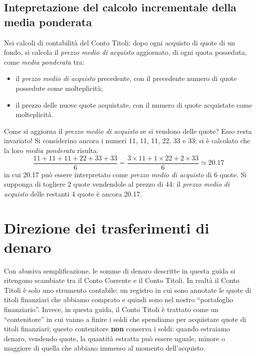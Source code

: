 \documentclass[12pt,a4paper]{article}
\newcommand{\Virgolette}[1]{``#1''}
\newcommand{\Pma}{\emph{prezzo medio di acquisto}}
\begin{document}
\subsection{Intepretazione del calcolo incrementale della media ponderata}

Nei calcoli di contabilità del Conto Titoli: dopo ogni  acquisto di quote di un fondo, si calcola il
\Pma{} aggiornato, di ogni quota posseduta, come \emph{media ponderata} tra:
\begin{itemize}
\item il \Pma{} precedente, con il precedente numero di quote possedute come molteplicità;
\item il prezzo delle nuove quote acquistate, con il numero di quote acquistate come molteplicità.
\end{itemize}

Come si aggiorna il \Pma{} se si vendono  delle quote?  Esso resta invariato!  Si considerino ancora
i numeri  \num{11}, \num{11}, \num{11}, \num{22},  \num{33} e \num{33};  si è calcolato che  la loro
\emph{media ponderata} risulta:
\begin{equation*}
  \frac{\num{11} + \num{11} + \num{11} + \num{22} + \num{33} + \num{33}}{6}
  = \frac{\num{3} \times{} \num{11}
     + \num{1} \times{} \num{22}
     + \num{2} \times{} \num{33}}
  {6} \simeq \num{20,17}
\end{equation*}
in cui \num{20,17}  può essere interpretato come  \Pma{} di \num{6} quote.  Si  supponga di togliere
\num{2} quote  vendendole al prezzo  di \num{44}:  il \Pma{} delle  restanti \num{4} quote  è ancora
\num{20,17}.

\section{Direzione dei trasferimenti di denaro}


Con abusiva semplificazione, le somme di denaro descritte in questa guida si ritengono scambiate tra
il Conto Corrente e il  Conto Titoli.  In realtà il Conto Titoli è  solo uno strumento contabile: un
registro in cui sono  annotate le quote di titoli finanziari che abbiamo  comprato e quindi sono nel
nostro \Virgolette{portafoglio  finanziario}.  Invece, in questa  guida, il Conto Titoli  è trattato
come un \Virgolette{contenitore} in cui vanno a finire i soldi che spendiamo per acquistare quote di
titoli  finanziari; questo  contenitore  \textbf{non}  conserva i  soldi:  quando estraiamo  denaro,
vendendo quote,  la quantità estratta  può essere  uguale, minore o  maggiore di quella  che abbiano
immesso al momento dell'acquisto.
\end{document}
